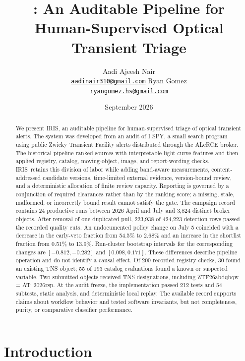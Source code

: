 \documentclass[11pt]{article}
\title{\iris: An Auditable Pipeline for Human-Supervised Optical Transient Triage}
\author{
  Aadi Ajeesh Nair\\[-1pt]
  {\normalfont\small\href{mailto:aadinair310@gmail.com}{\texttt{aadinair310@gmail.com}}}
  \And
  Ryan Gomez\\[-1pt]
  {\normalfont\small\href{mailto:ryangomez.hs@gmail.com}{\texttt{ryangomez.hs@gmail.com}}}
}
\date{September 2026}
\newcommand{\project}{I SPY}
\newcommand{\iris}{IRIS}
\begin{document}
\maketitle

\begin{abstract}
We present \iris, an auditable pipeline for human-supervised triage of optical transient alerts. The system was developed from an audit of \project, a small search program using public Zwicky Transient Facility alerts distributed through the ALeRCE broker. The historical pipeline ranked sources with interpretable light-curve features and then applied registry, catalog, moving-object, image, and report-wording checks. \iris\ retains this division of labor while adding band-aware measurements, content-addressed candidate versions, time-limited external evidence, version-bound review, and a deterministic allocation of finite review capacity. Reporting is governed by a conjunction of required clearances rather than by the ranking score; a missing, stale, malformed, or incorrectly bound result cannot satisfy the gate. The campaign record contains 24 productive runs between 2026 April and July and 3,824 distinct broker objects. After removal of one duplicated pull, 223,938 of 424,223 detection rows passed the recorded quality cuts. An undocumented policy change on July 5 coincided with a decrease in the early-veto fraction from 54.5\% to 2.68\% and an increase in the shortlist fraction from 0.51\% to 13.9\%. Run-cluster bootstrap intervals for the corresponding changes are $[-0.812,-0.282]$ and $[0.098,0.171]$. These differences describe pipeline operation and do not identify a causal effect. Of 200 recorded registry checks, 30 found an existing TNS object; 55 of 193 catalog evaluations found a known or suspected variable. Two submitted objects received TNS designations, including ZTF26abdqbqw = AT~2026rsp. At the audit freeze, the implementation passed 212 tests and 54 subtests, static analysis, and deterministic local replay. The available record supports claims about workflow behavior and tested software invariants, but not completeness, purity, or comparative classifier performance.
\end{abstract}


\section{Introduction}
\label{sec:introduction}
\end{document}
